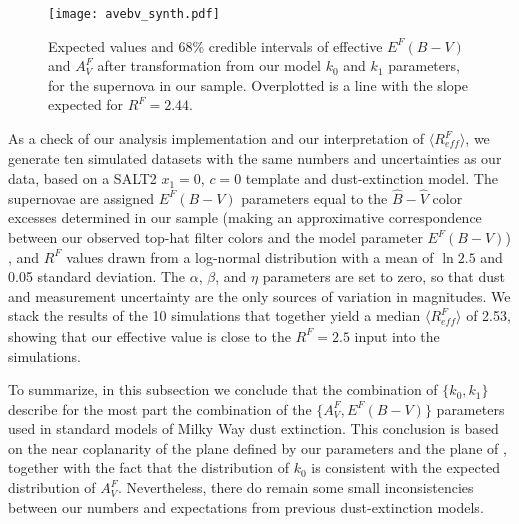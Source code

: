\documentclass{aastex61}   	%
\begin{document}
\begin{figure}[htbp] %
   \centering
   \texttt{[image: avebv\_synth.pdf]}
      \caption{
      Expected values and 68\% credible intervals of effective $E^F(B-V)$ and $A_V^F$ after transformation from our model $k_0$ and $k_1$ parameters, for the supernova in our sample.
      Overplotted is a line with the slope expected for $R^F=2.44$.
   \label{kk:fig}}
\end{figure}



As a check of our analysis implementation and our
interpretation of $\langle R^F_{\mathit{eff}}\rangle$, we generate ten simulated datasets with the same numbers and uncertainties as our data, based on a
SALT2 $x_1=0$, $c=0$ template and   dust-extinction model.  The supernovae
are assigned $E^F(B-V)$ parameters equal to the ${\hat{B}}-{\hat{V}}$ color excesses determined in our sample
(making an approximative correspondence between our observed top-hat filter colors and the 
model parameter $E^F(B-V)$) , and $R^F$ values drawn from a log-normal
distribution with a mean of $\ln{2.5}$ and 0.05 standard deviation.  The $\alpha$, $\beta$, and $\eta$ parameters are set to zero, so that dust and
measurement uncertainty are the only sources of variation in magnitudes.  We stack the results of the 10 simulations that together yield a median
$\langle R^F_{\mathit{eff}}\rangle$ of 2.53, showing that our effective value is close to the  $R^F=2.5$ input into the simulations.

To summarize, in this subsection
we conclude that the combination of
$\{k_0, k_1\}$ describe for the most part the combination of the $\{A^F_V, E^F(B-V)\}$ parameters used
in standard models of Milky Way dust extinction.  
This conclusion is based on the
near coplanarity of the plane defined by our parameters and the plane of  , together with the fact that 
the distribution of $k_0$ is consistent with the expected distribution of $A^F_V$.
Nevertheless, there do remain some small inconsistencies between our numbers and expectations from
previous dust-extinction
models.
\end{document}
